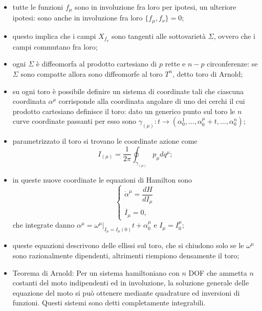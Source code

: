 \documentclass{article}
\theoremstyle{remark}
\begin{document}
\begin{itemize}
    \item tutte le funzioni $f_\mu$ sono in involuzione fra loro per ipotesi, un ulteriore ipotesi: sono anche in involuzione fra loro $\{f_\mu,f_\nu\}=0$;
    \item questo implica che i campi $X_{f_\nu}$ sono tangenti alle sottovarietà $\Sigma$, ovvero che i campi commutano fra loro;
    \item ogni $\Sigma$ è diffeomorfa al prodotto cartesiano di $p$ rette e $n-p$ circonferenze: se $\Sigma$ sono compatte allora sono diffeomorfe al toro $T^n$, detto toro di Arnold;
    \item su ogni toro è possibile definire un sistema di coordinate tali che ciascuna coordinata $\alpha^\mu$ corrisponde alla coordinata angolare di uno dei cerchi il cui prodotto cartesiano definisce il toro: dato un generico punto sul toro le $n$ curve coordinate passanti per esso sono $\gamma_{(\mu)}:t\to(\alpha^1_0,...,\alpha^\mu_0+t,...,\alpha^n_0)$;
    \item parametrizzato il toro si trovano le coordinate azione come
    \begin{equation}
        I_{(\mu)}=\frac{1}{2\pi}\oint_{\gamma_{(\mu)}} p_\mu dq^\mu;
    \end{equation}
    \item in queste nuove coordinate le equazioni di Hamilton sono
    \begin{equation}
    \begin{cases}
        \dot{\alpha}^\mu=\dfrac{dH}{dI_\mu} \\
        \dot{I_\mu}=0,
    \end{cases}
    \end{equation}
    che integrate danno $\alpha^\mu=\omega^\mu|_{I_\mu=I_\mu(0)} t+\alpha_0^\mu$ e $I_\mu=I_0^\mu$;
    \item queste equazioni descrivono delle ellissi sul toro, che si chiudono solo se le $\omega^\mu$ sono razionalmente dipendenti, altrimenti riempiono densamente il toro;
    \item Teorema di Arnold: Per un sistema hamiltoniano con $n$ DOF che ammetta $n$ costanti del moto indipendenti ed in involuzione, la soluzione generale delle equazione del moto si può ottenere mediante quadrature ed inversioni di funzioni. Questi sistemi sono detti completamente integrabili.
\end{itemize}
\end{document}
